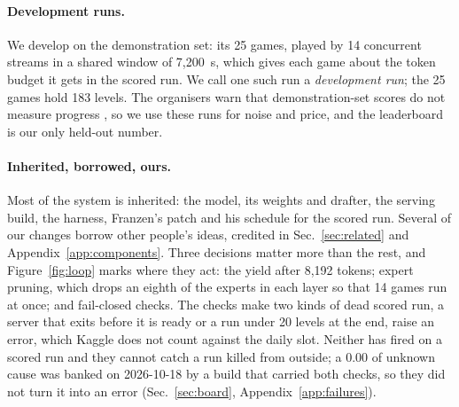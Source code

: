 \paragraph{Development runs.}
We develop on the demonstration set: its 25 games, played by 14 concurrent streams in a shared window of 7,200~s, which gives each game about the token budget it gets in the scored run. %
We call one such run a \emph{development run}; the 25 games hold 183 levels. %
The organisers warn that demonstration-set scores do not measure progress \citep{arcprize2026arcagi3}, so we use these runs for noise and price, and the leaderboard is our only held-out number.

\paragraph{Inherited, borrowed, ours.}
Most of the system is inherited: the model, its weights and drafter, the serving build, the harness, Franzen's patch and his schedule for the scored run. %
Several of our changes borrow other people's ideas, credited in Sec.~\ref{sec:related} and Appendix~\ref{app:components}.
Three decisions matter more than the rest, and Figure~\ref{fig:loop} marks where they act: the yield after 8,192 tokens; expert pruning, which drops an eighth of the experts in each layer so that 14 games run at once; and fail-closed checks. %
The checks make two kinds of dead scored run, a server that exits before it is ready or a run under 20 levels at the end, raise an error, which Kaggle does not count against the daily slot. %
Neither has fired on a scored run and they cannot catch a run killed from outside; a 0.00 of unknown cause was banked on 2026-10-18 by a build that carried both checks, so they did not turn it into an error (Sec.~\ref{sec:board}, Appendix~\ref{app:failures}). %
